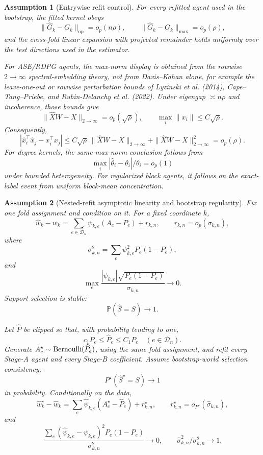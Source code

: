 \documentclass[12pt]{article}
\newtheorem{assumption}{Assumption}
\newcommand{\1}{\mathbf{1}}
\providecommand{\op}{\operatorname{op}}
\providecommand{\Pb}{\mathbb P}
\begin{document}
\begin{assumption}[Entrywise refit control]\label{ass:entrywise-refit-final2}
For every refitted agent used in the bootstrap, the fitted kernel obeys
\[
  \|\widehat G_k-G_k\|_{\op}=o_p(n\rho),
  \qquad
  \|\widehat G_k-G_k\|_{\max}=o_p(\rho),
\]
and the cross-fold linear expansion with projected remainder holds
uniformly over the test directions used in the estimator.

For ASE/RDPG agents, the max-norm display is obtained from the rowwise
\(2\to\infty\) spectral-embedding theory, not from Davis--Kahan alone,
for example the leave-one-out or rowwise perturbation bounds of
Lyzinski et al. (2014), Cape--Tang--Priebe, and
Rubin-Delanchy et al. (2022).  Under eigengap \(\asymp n\rho\) and
incoherence, those bounds give
\[
  \|\widehat XW-X\|_{2\to\infty}=o_p(\sqrt\rho),
  \qquad
  \max_i\|x_i\|\le C\sqrt\rho .
\]
Consequently,
\[
  |\widehat x_i^\top\widehat x_j-x_i^\top x_j|
  \le
  C\sqrt\rho\,\|\widehat XW-X\|_{2\to\infty}
  +\|\widehat XW-X\|_{2\to\infty}^2
  =
  o_p(\rho).
\]
For degree kernels, the same max-norm conclusion follows from
\[
  \max_i|\widehat\theta_i-\theta_i|/\theta_i=o_p(1)
\]
under bounded heterogeneity.  For regularized block agents, it follows
on the exact-label event from uniform block-mean concentration.
\end{assumption}

\begin{assumption}[Nested-refit asymptotic linearity and bootstrap regularity]
\label{ass:nested-refit-final2}
Fix one fold assignment and condition on it.  For a fixed coordinate
\(k\),
\[
  \widehat w_k-w_k
  =
  \sum_{e\in\mathcal D_n}\psi_{k,e}(A_e-P_e)+r_{k,n},
  \qquad
  r_{k,n}=o_p(\sigma_{k,n}),
\]
where
\[
  \sigma_{k,n}^2
  =
  \sum_e\psi_{k,e}^2P_e(1-P_e),
\]
and
\[
  \max_e
  \frac{|\psi_{k,e}|\sqrt{P_e(1-P_e)}}{\sigma_{k,n}}
  \to0.
\]
Support selection is stable:
\[
  \Pb(\widehat S=S)\to1.
\]

Let \(\widehat P\) be clipped so that, with probability tending to one,
\[
  c_1P_e\le \widehat P_e\le C_1P_e
  \quad(e\in\mathcal D_n).
\]
Generate \(A_e^\star\sim{\rm Bernoulli}(\widehat P_e)\), using the same
fold assignment, and refit every Stage-A agent and every Stage-B
coefficient.  Assume bootstrap-world selection consistency:
\[
  P^\star(\widehat S^\star=S)\to1
\]
in probability.  Conditionally on the data,
\[
  \widehat w_k^\star-\widehat w_k
  =
  \sum_e\widehat\psi_{k,e}(A_e^\star-\widehat P_e)
  +
  r_{k,n}^\star,
  \qquad
  r_{k,n}^\star=o_{P^\star}(\widehat\sigma_{k,n}),
\]
and
\[
  \frac{
    \sum_e(\widehat\psi_{k,e}-\psi_{k,e})^2P_e(1-P_e)
  }{\sigma_{k,n}^2}
  \to0,
  \qquad
  \widehat\sigma_{k,n}^2/\sigma_{k,n}^2\to1.
\]
\end{assumption}
\end{document}
